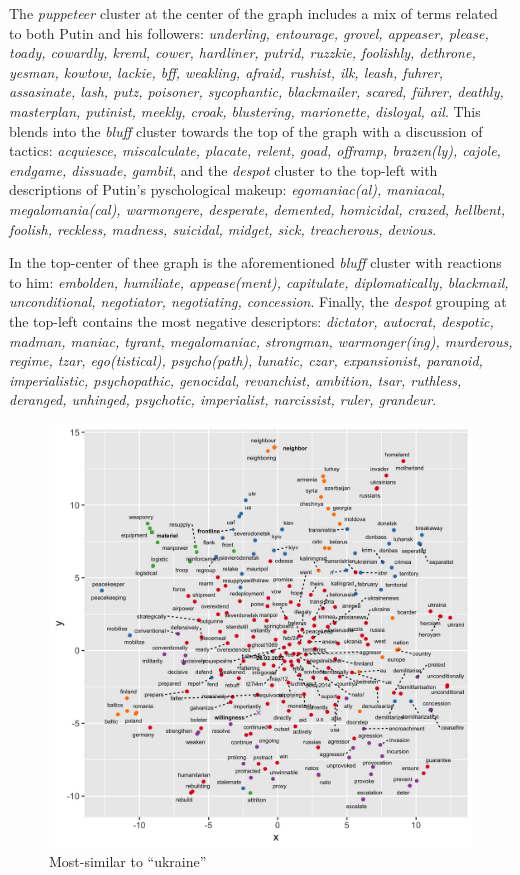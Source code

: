 \documentclass[doublespacing]{utdthesis}
\begin{document}
The \emph{puppeteer} cluster at the center of the graph includes a mix of terms related to both Putin and his followers: \emph{underling, entourage, grovel, appeaser, please, toady, cowardly, kreml, cower, hardliner, putrid, ruzzkie, foolishly, dethrone, yesman, kowtow, lackie, bff, weakling, afraid, rushist, ilk, leash, fuhrer, assasinate, lash, putz, poisoner, sycophantic, blackmailer, scared, führer, deathly, masterplan, putinist, meekly, croak, blustering, marionette, disloyal, ail}.
This blends into the \emph{bluff} cluster towards the top of the graph with a discussion of tactics: \emph{acquiesce, miscalculate, placate, relent, goad, offramp, brazen(ly), cajole, endgame, dissuade, gambit}, and the \emph{despot} cluster to the top-left with descriptions of Putin's pyschological makeup: \emph{egomaniac(al), maniacal, megalomania(cal), warmongere, desperate, demented, homicidal, crazed, hellbent, foolish, reckless, madness, suicidal, midget, sick, treacherous, devious}.

In the top-center of thee graph is the aforementioned \emph{bluff} cluster with reactions to him: \emph{embolden, humiliate, appease(ment), capitulate, diplomatically, blackmail, unconditional, negotiator, negotiating, concession}.
Finally, the \emph{despot} grouping at the top-left contains the most negative descriptors: \emph{dictator, autocrat, despotic, madman, maniac, tyrant, megalomaniac, strongman, warmonger(ing), murderous, regime, tzar, ego(tistical), psycho(path), lunatic, czar, expansionist, paranoid, imperialistic, psychopathic, genocidal, revanchist, ambition, tsar, ruthless, deranged, unhinged, psychotic, imperialist, narcissist, ruler, grandeur}.

\begin{figure}[!ht]
\centering
\includegraphics[width=\textwidth]{2022/ukraine}
\caption{Most-similar to ``ukraine''}
\label{fig:ukraine_2022}
\end{figure}
\end{document}

